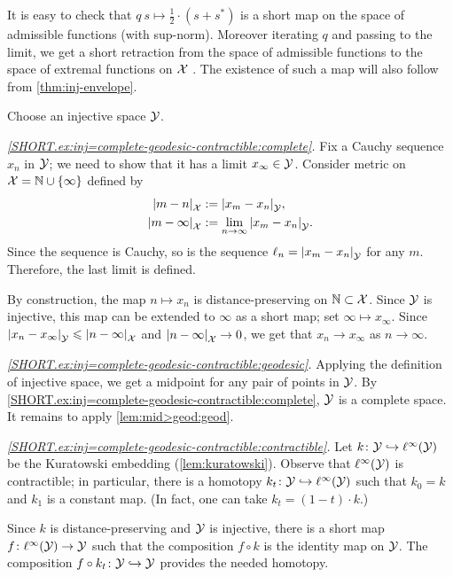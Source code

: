 It is easy to check that $q\:s\mapsto \tfrac12\cdot(s+s^*)$ is a short map on the space of admissible functions (with sup-norm).
Moreover iterating $q$ and passing to the limit, we get a short retraction from the space of admissible functions to the space of extremal functions on $\mathcal{X}$ \cite[see 3.1 in][]{lang-2013}.
The existence of such a map will also follow from \ref{thm:inj-envelope}.

Choose an injective space $\mathcal{Y}$.

\textit{\ref{SHORT.ex:inj=complete-geodesic-contractible:complete}.}
Fix a Cauchy sequence $x_n$ in $\mathcal{Y}$;
we need to show that it has a limit $x_\infty\in \mathcal{Y}$.
Consider metric on $\mathcal{X}=\mathbb{N}\cup\{\infty\}$ defined by 
\begin{align*}
\dist{m}{n}{\spc{X}}&\df\dist{x_m}{x_n}{\spc{Y}},
\\
\dist{m}{\infty}{\spc{X}}&\df\lim_{n\to\infty}\dist{x_m}{x_n}{\spc{Y}}.
\end{align*}
Since the sequence is Cauchy, so is the sequence $\ell_n=\dist{x_m}{x_n}{\spc{Y}}$ for any $m$.
Therefore, the last limit is defined.

By construction, the map $n\mapsto x_n$ is distance-preserving on $\mathbb{N}\subset \mathcal{X}$.
Since $\mathcal{Y}$ is injective, this map can be extended to $\infty$ as a short map; set $\infty\mapsto x_\infty$.
Since $\dist{x_n}{x_\infty}{\spc{Y}}\le \dist{n}{\infty}{\spc{X}}$ 
and $\dist{n}{\infty}{\spc{X}}\to 0$, we get that
$x_n\to x_\infty$ as $n\to\infty$.

\textit{\ref{SHORT.ex:inj=complete-geodesic-contractible:geodesic}.}
Applying the definition of injective space, we get a midpoint for any pair of points in $\mathcal{Y}$.
By \ref{SHORT.ex:inj=complete-geodesic-contractible:complete},
$\mathcal{Y}$ is a complete space.
It remains to apply \ref{lem:mid>geod:geod}.

\textit{\ref{SHORT.ex:inj=complete-geodesic-contractible:contractible}.}
Let $k\colon\mathcal{Y}\hookrightarrow \ell^\infty(\mathcal{Y})$ be the Kuratowski embedding (\ref{lem:kuratowski}).
Observe that $\ell^\infty(\mathcal{Y})$ is contractible;
in particular, there is a homotopy $k_t\colon\mathcal{Y}\hookrightarrow \ell^\infty(\mathcal{Y})$ such that $k_0=k$ and $k_1$ is a constant map.
(In fact, one can take $k_t=(1-t)\cdot k$.)

Since $k$ is distance-preserving and $\mathcal{Y}$ is injective,
there is a short map $f\colon\ell^\infty(\mathcal{Y})\to \mathcal{Y}$ such that the composition $f\circ k$ is the identity map on $\mathcal{Y}$.
The composition $f\circ k_t\colon\mathcal{Y}\hookrightarrow \mathcal{Y}$ provides the needed homotopy. 

